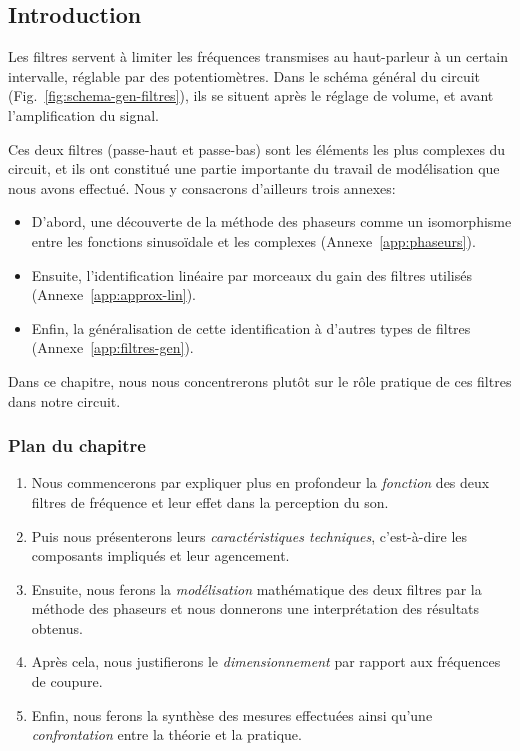 \subsection*{Introduction}

Les filtres servent à limiter les fréquences transmises au haut-parleur
à un certain intervalle, réglable par des potentiomètres.
Dans le schéma général du circuit (Fig.~\ref{fig:schema-gen-filtres}),
ils se situent après le réglage de volume, et avant l'amplification du signal.

Ces deux filtres (passe-haut et passe-bas) sont les éléments les plus complexes
du circuit, et ils ont constitué
une partie importante du travail de modélisation que nous avons effectué.
Nous y consacrons d'ailleurs trois annexes:
\begin{itemize}
    \item D'abord, une découverte de la méthode des phaseurs
        comme un isomorphisme
        entre les fonctions sinusoïdale et les complexes
        (Annexe~\ref{app:phaseurs}).
    \item Ensuite,
        l'identification linéaire par morceaux du gain des filtres utilisés
        (Annexe~\ref{app:approx-lin}).
    \item Enfin,
        la généralisation de cette identification à d'autres types de filtres
        (Annexe~\ref{app:filtres-gen}).
\end{itemize}

Dans ce chapitre,
nous nous concentrerons plutôt sur le rôle pratique de ces filtres
dans notre circuit.

\subsubsection*{Plan du chapitre}
\begin{enumerate}
    \item Nous commencerons par expliquer plus en profondeur la \emph{fonction}
        des deux filtres de fréquence et leur effet dans la perception du son.
    \item Puis nous présenterons leurs \emph{caractéristiques techniques},
        c'est-à-dire les composants impliqués et leur agencement.
    \item Ensuite, nous ferons la \emph{modélisation} mathématique
        des deux filtres
        par la méthode des phaseurs et nous donnerons une interprétation
		des résultats obtenus.
    \item Après cela, nous justifierons le \emph{dimensionnement} par rapport
        aux fréquences de coupure.
    \item Enfin, nous ferons la synthèse des mesures effectuées ainsi qu'une
        \emph{confrontation} entre la théorie et la pratique.
\end{enumerate}
